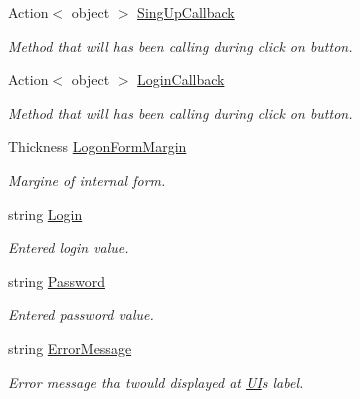 \begin{DoxyCompactItemize}
\item 
Action$<$ object $>$ \mbox{\hyperlink{class_wpf_handler_1_1_u_i_1_1_controls_1_1_logon_1_1_logon_panel_a6fc870650cd4c39be458e1da94bc8d70}{Sing\+Up\+Callback}}
\begin{DoxyCompactList}\small\item\em Method that will has been calling during click on button. \end{DoxyCompactList}\item 
Action$<$ object $>$ \mbox{\hyperlink{class_wpf_handler_1_1_u_i_1_1_controls_1_1_logon_1_1_logon_panel_a5bb96bdb64897d8822d07c0d3e6fa51e}{Login\+Callback}}
\begin{DoxyCompactList}\small\item\em Method that will has been calling during click on button. \end{DoxyCompactList}\item 
Thickness \mbox{\hyperlink{class_wpf_handler_1_1_u_i_1_1_controls_1_1_logon_1_1_logon_panel_abaaf66c7a6670520ca218fe83f571208}{Logon\+Form\+Margin}}
\begin{DoxyCompactList}\small\item\em Margine of internal form. \end{DoxyCompactList}\item 
string \mbox{\hyperlink{class_wpf_handler_1_1_u_i_1_1_controls_1_1_logon_1_1_logon_panel_abf1db78189d11dc269252a5888f7a613}{Login}}
\begin{DoxyCompactList}\small\item\em Entered login value. \end{DoxyCompactList}\item 
string \mbox{\hyperlink{class_wpf_handler_1_1_u_i_1_1_controls_1_1_logon_1_1_logon_panel_a2b5b8a76a045af6351be2ddaab3ebaf0}{Password}}
\begin{DoxyCompactList}\small\item\em Entered password value. \end{DoxyCompactList}\item 
string \mbox{\hyperlink{class_wpf_handler_1_1_u_i_1_1_controls_1_1_logon_1_1_logon_panel_afa45374205dd8e659e084df9699e49b6}{Error\+Message}}
\begin{DoxyCompactList}\small\item\em Error message tha twould displayed at \mbox{\hyperlink{namespace_wpf_handler_1_1_u_i}{UI}}\textquotesingle{}s label. \end{DoxyCompactList}\end{DoxyCompactItemize}
